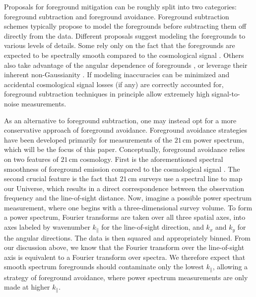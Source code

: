 \documentclass[twocolumn,aps,prd,nofootinbib,showpacs]{revtex4-1}
\begin{document}
Proposals for foreground mitigation can be roughly split into two categories: foreground subtraction and foreground avoidance.  Foreground subtraction schemes typically propose to model the foregrounds before subtracting them off directly from the data.  Different proposals suggest modeling the foregrounds to various levels of details.  Some rely only on the fact that the foregrounds are expected to be spectrally smooth compared to the cosmological signal \cite{Wang2006,Gleser2008,Liu2009a,Bowman2009,Harker2009,Liu2009b,Petrovic2011,Cho2012,Liu2012,Parsons2012b}.  Others also take advantage of the angular dependence of foregrounds \cite{Paciga2011,Liu2011,Dillon2013,Masui2013,Dillon2014}, or leverage their inherent non-Gaussianity \cite{Chapman2012,Chapman2013}.  If modeling inaccuracies can be minimized and accidental cosmological signal losses (if any) are correctly accounted for, foreground subtraction techniques in principle allow extremely high signal-to-noise measurements.

As an alternative to foreground subtraction, one may instead opt for a more conservative approach of foreground avoidance.  Foreground avoidance strategies have been developed primarily for measurements of the $21\,\textrm{cm}$ power spectrum, which will be the focus of this paper.  Conceptually, foreground avoidance relies on two features of $21\,\textrm{cm}$ cosmology.  First is the aforementioned spectral smoothness of foreground emission compared to the cosmological signal \cite{Oh2003}.  The second crucial feature is the fact that $21\,\textrm{cm}$ surveys use a spectral line to map our Universe, which results in a direct correspondence between the observation frequency and the line-of-sight distance.  Now, imagine a possible power spectrum measurement, where one begins with a three-dimensional survey volume.  To form a power spectrum, Fourier transforms are taken over all three spatial axes, into axes labeled by wavenumber $k_\parallel$ for the line-of-sight direction, and $k_x$ and $k_y$ for the angular directions.  The data is then squared and appropriately binned.  From our discussion above, we know that the Fourier transform over the line-of-sight axis is equivalent to a Fourier transform over spectra.  We therefore expect that smooth spectrum foregrounds should contaminate only the lowest $k_\parallel$, allowing a strategy of foreground avoidance, where power spectrum measurements are only made at higher $k_\parallel$.
\end{document}
